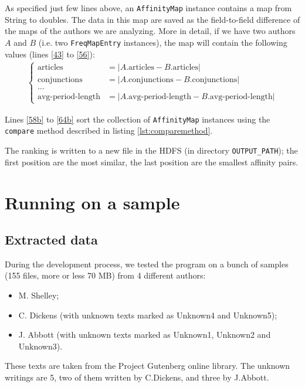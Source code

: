 \documentclass[a4paper,11pt, twoside]{article}
\begin{document}
 	\bigskip
 	\noindent
	As specified just few lines above, an \lstinline|AffinityMap| instance contains a map from String to doubles. The data in this map are saved as the field-to-field difference of the maps of the authors we are analyzing. More in detail, if we have two authors $A$ and $B$ (i.e. two \lstinline|FreqMapEntry| instances), the map will contain the following values (lines \ref{43} to \ref{56}):
	\begin{align*}
		\begin{cases}
			\text{articles} &= |A.\text{articles} - B.\text{articles}| \\
			\text{conjunctions} &= |A. \text{conjunctions}- B.\text{conjunctions}| \\
			\dots& \\
			\text{avg-period-length}&= |A.\text{avg-period-length} - B.\text{avg-period-length}|
		\end{cases}
	\end{align*}
	
	\noindent
	Lines \ref{58b} to \ref{64b} sort the collection of \lstinline|AffinityMap| instances using the \lstinline|compare| method described in listing \ref{lst:comparemethod}.
	
	\noindent
	The ranking is written to a new file in the HDFS (in directory \lstinline|OUTPUT_PATH|); the first position are the most similar, the last position are the smallest affinity pairs.
	

	
	\newpage
	\section{Running on a sample}\label{sample}
	\subsection{Extracted data}
	During the development process, we tested the program on a bunch of samples (155 files, more or less 70 MB) from 4 different authors: \begin{itemize}
	\item M. Shelley;
	\item C. Dickens (with unknown texts marked as Unknown4 and Unknown5);
	\item J. Abbott (with unknown texts marked as Unknown1, Unknown2 and Unknown3).
\end{itemize}

\noindent
These texts are taken from the Project Gutenberg online library. The unknown writings are 5, two of them written by C.Dickens, and three by J.Abbott.
\end{document}
